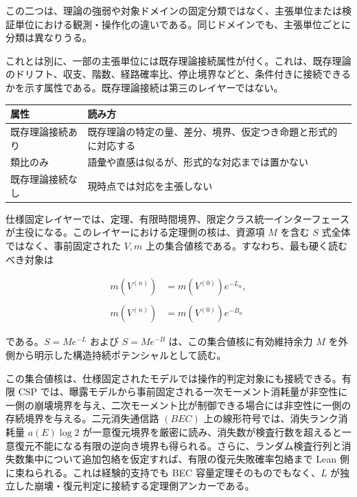 \documentclass[12pt,a4paper]{article}
\begin{document}
この二つは、理論の強弱や対象ドメインの固定分類ではなく、主張単位または検証単位における観測・操作化の違いである。同じドメインでも、主張単位ごとに分類は異なりうる。

これとは別に、一部の主張単位には既存理論接続属性が付く。これは、既存理論のドリフト、収支、階数、経路確率比、停止境界などと、条件付きに接続できるかを示す属性である。既存理論接続は第三のレイヤーではない。

{\def\LTcaptype{table} %
\begin{longtable}[]{@{}
  >{\raggedright\arraybackslash}p{}
  >{\raggedright\arraybackslash}p{}@{}}
\toprule\noalign{}
\begin{minipage}[b]{\linewidth}\raggedright
属性
\end{minipage} & \begin{minipage}[b]{\linewidth}\raggedright
読み方
\end{minipage} \\
\midrule\noalign{}
\endhead
\bottomrule\noalign{}
\endlastfoot
既存理論接続あり & 既存理論の特定の量、差分、境界、仮定つき命題と形式的に対応する \\
類比のみ & 語彙や直感は似るが、形式的な対応までは置かない \\
既存理論接続なし & 現時点では対応を主張しない \\
\end{longtable}
}

仕様固定レイヤーでは、定理、有限時間境界、限定クラス統一インターフェースが主役になる。このレイヤーにおける定理側の核は、資源項 \(M\) を含む \(S\) 式全体ではなく、事前固定された \(V,m\) 上の集合値核である。すなわち、最も硬く読むべき対象は

\[
\begin{aligned}
m(V^{(n)})&=m(V^{(0)})e^{-L_{n}}, \\
\qquad \\
m(V^{(n)})&=m(V^{(0)})e^{-B_{n}}
\end{aligned}
\]

である。\(S=Me^{-L}\) および \(S=Me^{-B}\) は、この集合値核に有効維持余力 \(M\) を外側から明示した構造持続ポテンシャルとして読む。

この集合値核は、仕様固定されたモデルでは操作的判定対象にも接続できる。有限 CSP では、曝露モデルから事前固定される一次モーメント消耗量が非空性に一側の崩壊境界を与え、二次モーメント比が制御できる場合には非空性に一側の存続境界を与える。二元消失通信路 \((BEC)\) 上の線形符号では、消失ランク消耗量 \(a(E)\log 2\) が一意復元境界を厳密に読み、消失数が検査行数を超えると一意復元不能になる有限の逆向き境界も得られる。さらに、ランダム検査行列と消失数集中について追加包絡を仮定すれば、有限の復元失敗確率包絡まで Lean 側に束ねられる。これは経験的支持でも BEC 容量定理そのものでもなく、\(L\) が独立した崩壊・復元判定に接続する定理側アンカーである。
\end{document}

